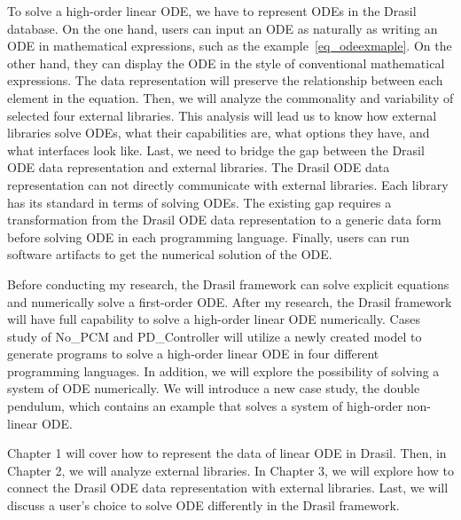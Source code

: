 To solve a high-order linear ODE, we have to represent ODEs in the Drasil database. On the one hand, users can input an ODE as naturally as writing an ODE in mathematical expressions, such as the example~\ref{eq_odeexmaple}. On the other hand, they can display the ODE in the style of conventional mathematical expressions. The data representation will preserve the relationship between each element in the equation. Then, we will analyze the commonality and variability of selected four external libraries. This analysis will lead us to know how external libraries solve ODEs, what their capabilities are, what options they have, and what interfaces look like. Last, we need to bridge the gap between the Drasil ODE data representation and external libraries. The Drasil ODE data representation can not directly communicate with external libraries. Each library has its standard in terms of solving ODEs. The existing gap requires a transformation from the Drasil ODE data representation to a generic data form before solving ODE in each programming language. Finally, users can run software artifacts to get the numerical solution of the ODE.

Before conducting my research, the Drasil framework can solve explicit equations and numerically solve a first-order ODE. After my research, the Drasil framework will have full capability to solve a high-order linear ODE numerically. Cases study of No\_PCM and PD\_Controller will utilize a newly created model to generate programs to solve a high-order linear ODE in four different programming languages. In addition, we will explore the possibility of solving a system of ODE numerically. We will introduce a new case study, the double pendulum, which contains an example that solves a system of high-order non-linear ODE.

Chapter 1 will cover how to represent the data of linear ODE in Drasil. Then, in Chapter 2, we will analyze external libraries. In Chapter 3, we will explore how to connect the Drasil ODE data representation with external libraries. Last, we will discuss a user's choice to solve ODE differently in the Drasil framework.